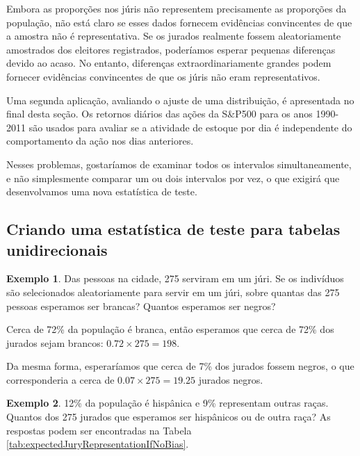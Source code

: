 \documentclass[
]{book}
\theoremstyle{definition}
\theoremstyle{definition}
\newtheorem{example}{Exemplo}[chapter]
\theoremstyle{definition}
\theoremstyle{definition}
\theoremstyle{remark}
\begin{document}
Embora as proporções nos júris não representem precisamente as proporções da população, não está claro se esses dados fornecem evidências convincentes de que a amostra não é representativa. Se os jurados realmente fossem aleatoriamente amostrados dos eleitores registrados, poderíamos esperar pequenas diferenças devido ao acaso. No entanto, diferenças extraordinariamente grandes podem fornecer evidências convincentes de que os júris não eram representativos.

Uma segunda aplicação, avaliando o ajuste de uma distribuição, é apresentada no final desta seção. Os retornos diários das ações da S\&P500 para os anos 1990-2011 são usados para avaliar se a atividade de estoque por dia é independente do comportamento da ação nos dias anteriores.

Nesses problemas, gostaríamos de examinar todos os intervalos simultaneamente, e não simplesmente comparar um ou dois intervalos por vez, o que exigirá que desenvolvamos uma nova estatística de teste.

\hypertarget{testStatisticUnidirectionalTables}{%
\subsection{Criando uma estatística de teste para tabelas unidirecionais}\label{testStatisticUnidirectionalTables}}

\begin{example}
\protect\hypertarget{exm:unnamed-chunk-236}{}{\label{exm:unnamed-chunk-236} }Das pessoas na cidade, 275 serviram em um júri. Se os indivíduos são selecionados aleatoriamente para servir em um júri, sobre quantas das 275 pessoas esperamos ser brancas? Quantos esperamos ser negros?
\end{example}

Cerca de 72\% da população é branca, então esperamos que cerca de 72\% dos jurados sejam brancos: \(0.72\times 275 = 198\).

Da mesma forma, esperaríamos que cerca de 7\% dos jurados fossem negros, o que corresponderia a cerca de \(0.07\times 275 = 19.25\) jurados negros.

\begin{example}
\protect\hypertarget{exm:unnamed-chunk-237}{}{\label{exm:unnamed-chunk-237} }12\% da população é hispânica e 9\% representam outras raças. Quantos dos 275 jurados que esperamos ser hispânicos ou de outra raça? As respostas podem ser encontradas na Tabela \ref{tab:expectedJuryRepresentationIfNoBias}.
\end{example}
\end{document}

